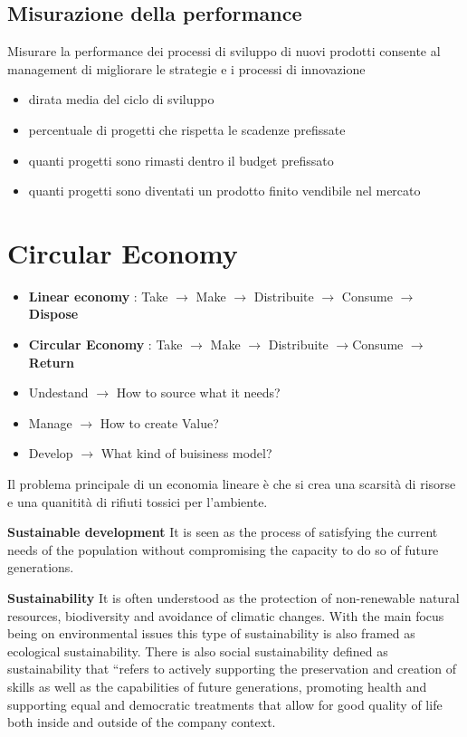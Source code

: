 \documentclass{article}
\begin{document}
\subsection{Misurazione della performance}
Misurare la performance dei processi di sviluppo di
nuovi prodotti consente al management di migliorare
le strategie e i processi di innovazione

\begin{itemize}
	\item dirata media del ciclo di sviluppo
	\item percentuale di progetti che rispetta le scadenze prefissate
	\item quanti progetti sono rimasti dentro il budget prefissato 
	\item quanti progetti sono diventati un prodotto finito vendibile nel mercato
\end{itemize}

\section{Circular Economy}

\begin{itemize}
	\item \textbf{Linear economy} : Take $\rightarrow$ Make  $\rightarrow$ Distribuite $\rightarrow$ Consume  $\rightarrow$ \textbf{ Dispose}
	\item \textbf{Circular Economy} :  Take  $\rightarrow$ Make  $\rightarrow$ Distribuite $\rightarrow$Consume  $\rightarrow$  \textbf{Return}
\end{itemize}



\begin{itemize}
	\item Undestand $\rightarrow$ How to source what it needs?
	\item Manage  $\rightarrow$ How to create Value?
	\item Develop  $\rightarrow$ What kind of buisiness model?
\end{itemize}

Il problema principale di un economia lineare è che si crea una scarsità di risorse e una quanitità di rifiuti tossici per l'ambiente.

\textbf{Sustainable development}
It is seen as the process of satisfying the current needs of the population without compromising the
capacity to do so of future generations.

\textbf{Sustainability}
It is often understood as the protection of non-renewable natural resources, biodiversity and avoidance
of climatic changes.
With the main focus being on environmental issues this type of sustainability is also framed as ecological
sustainability. There is also social sustainability defined as sustainability that “refers to actively supporting
the preservation and creation of skills as well as the capabilities of future generations, promoting health
and supporting equal and democratic treatments that allow for good quality of life both inside and
outside of the company context.
\end{document}
